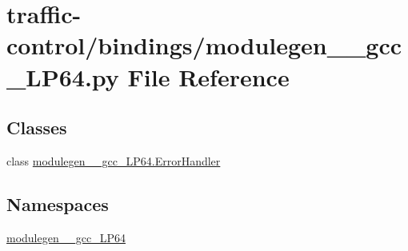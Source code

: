\hypertarget{traffic-control_2bindings_2modulegen____gcc__LP64_8py}{}\section{traffic-\/control/bindings/modulegen\+\_\+\+\_\+gcc\+\_\+\+L\+P64.py File Reference}
\label{traffic-control_2bindings_2modulegen____gcc__LP64_8py}
\subsection*{Classes}
\begin{DoxyCompactItemize}
\item 
class \hyperlink{classmodulegen____gcc__LP64_1_1ErrorHandler}{modulegen\+\_\+\+\_\+gcc\+\_\+\+L\+P64.\+Error\+Handler}
\end{DoxyCompactItemize}
\subsection*{Namespaces}
\begin{DoxyCompactItemize}
\item 
 \hyperlink{namespacemodulegen____gcc__LP64}{modulegen\+\_\+\+\_\+gcc\+\_\+\+L\+P64}
\end{DoxyCompactItemize}
